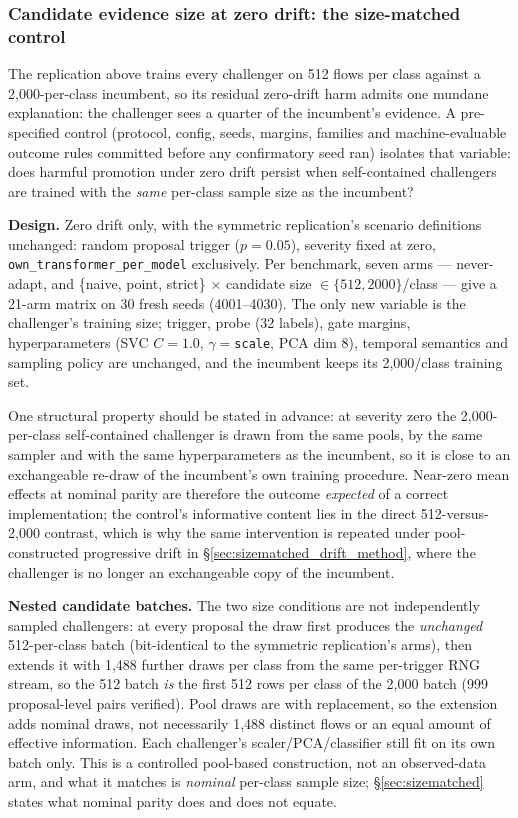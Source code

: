 \documentclass[a4paper,fleqn]{cas-sc}
\begin{document}
\subsubsection{Candidate evidence size at zero drift: the size-matched control}
\label{sec:sizematched_method}

The replication above trains every challenger on 512 flows per class against a 2{,}000-per-class incumbent, so its residual zero-drift harm admits one mundane explanation: the challenger sees a quarter of the incumbent's evidence. A pre-specified control (protocol, config, seeds, margins, families and machine-evaluable outcome rules committed before any confirmatory seed ran) isolates that variable: does harmful promotion under zero drift persist when self-contained challengers are trained with the \emph{same} per-class sample size as the incumbent?

\textbf{Design.} Zero drift only, with the symmetric replication's scenario definitions unchanged: random proposal trigger ($p{=}0.05$), severity fixed at zero, \texttt{own\_transformer\_per\_model} exclusively. Per benchmark, seven arms --- never-adapt, and \{naive, point, strict\} $\times$ candidate size $\in \{512, 2000\}$/class --- give a 21-arm matrix on 30 fresh seeds (4001--4030). The only new variable is the challenger's training size; trigger, probe (32 labels), gate margins, hyperparameters (SVC $C{=}1.0$, $\gamma{=}$\texttt{scale}, PCA dim 8), temporal semantics and sampling policy are unchanged, and the incumbent keeps its 2{,}000/class training set.

One structural property should be stated in advance: at severity zero the 2{,}000-per-class self-contained challenger is drawn from the same pools, by the same sampler and with the same hyperparameters as the incumbent, so it is close to an exchangeable re-draw of the incumbent's own training procedure. Near-zero mean effects at nominal parity are therefore the outcome \emph{expected} of a correct implementation; the control's informative content lies in the direct 512-versus-2{,}000 contrast, which is why the same intervention is repeated under pool-constructed progressive drift in \S\ref{sec:sizematched_drift_method}, where the challenger is no longer an exchangeable copy of the incumbent.

\textbf{Nested candidate batches.} The two size conditions are not independently sampled challengers: at every proposal the draw first produces the \emph{unchanged} 512-per-class batch (bit-identical to the symmetric replication's arms), then extends it with 1{,}488 further draws per class from the same per-trigger RNG stream, so the 512 batch \emph{is} the first 512 rows per class of the 2{,}000 batch (999 proposal-level pairs verified). Pool draws are with replacement, so the extension adds nominal draws, not necessarily 1{,}488 distinct flows or an equal amount of effective information. Each challenger's scaler/PCA/classifier still fit on its own batch only. This is a controlled pool-based construction, not an observed-data arm, and what it matches is \emph{nominal} per-class sample size; \S\ref{sec:sizematched} states what nominal parity does and does not equate.
\end{document}
